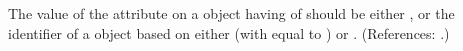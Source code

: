 The value of the attribute  on a \Compartment object having
 of  should be either 
, or the identifier of a \UnitDefinition object based on
either  (with  equal to ) or
.  (References: .)
